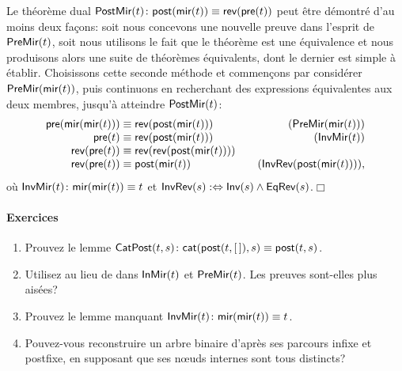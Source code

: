 Le théorème dual \(\textsf{PostMir}({t})
\colon \textsf{post}(\textsf{mir}(t)) \equiv
\textsf{rev}(\textsf{pre}(t))\)
 
 peut être démontré d'au moins deux façons:
soit nous concevons une nouvelle preuve dans l'esprit de
\(\textsf{PreMir}({t})\), soit nous utilisons le fait que le théorème est
une équivalence et nous produisons alors une suite de théorèmes
équivalents, dont le dernier est simple à établir. Choisissons cette
seconde méthode et commençons par considérer
\(\textsf{PreMir}({\textsf{mir}(t)})\),
puis continuons en recherchant des expressions équivalentes aux deux
membres, jusqu'à atteindre \(\textsf{PostMir}({t})\):
\begin{equation*}
\begin{array}{@{}r@{\;}c@{\;}l@{\qquad}r@{}}
          \fun{pre}(\fun{mir}(\fun{mir}(t)))
& \equiv
& \fun{rev}(\fun{post}(\fun{mir}(t)))
& (\pred{PreMir}{\fun{mir}(t)})\\
  \fun{pre}(t)
& \equiv
& \fun{rev}(\fun{post}(\fun{mir}(t)))
& (\pred{InvMir}{t})\\
  \fun{rev}(\fun{pre}(t))
& \equiv
& \fun{rev}(\fun{rev}(\fun{post}(\fun{mir}(t))))\\
  \fun{rev}(\fun{pre}(t))
& \equiv
& \fun{post}(\fun{mir}(t))
& (\pred{InvRev}{\fun{post}(\fun{mir}(t))}),
\end{array}
\end{equation*}
où \(\textsf{InvMir}({t}) \colon
\textsf{mir}(\textsf{mir}(t)) \equiv t\) et
\(\textsf{InvRev}({s}) :\Leftrightarrow \textsf{Inv}({s}) \wedge
\textsf{EqRev}({s})\).\hfill\(\Box\)

\paragraph{Exercices}
\begin{enumerate}

  \item Prouvez le lemme
  \(\textsf{CatPost}({t,s}) \colon \textsf{cat}(\textsf{post}(t,[\,]),s) \equiv
  \textsf{post}(t,s)\).

  \item Utilisez  au lieu de  dans
  \(\textsf{InMir}({t})\) et \(\textsf{PreMir}({t})\). Les preuves sont-elles
  plus aisées?

  \item Prouvez le lemme manquant
  \(\textsf{InvMir}({t}) \colon \textsf{mir}(\textsf{mir}(t)) \equiv
  t\).\label{ex_mir_mir}

\item Pouvez-vous reconstruire un arbre binaire d'après ses parcours
  infixe et postfixe, en supposant que ses n{\oe}uds internes sont
  tous distincts?

\end{enumerate}

